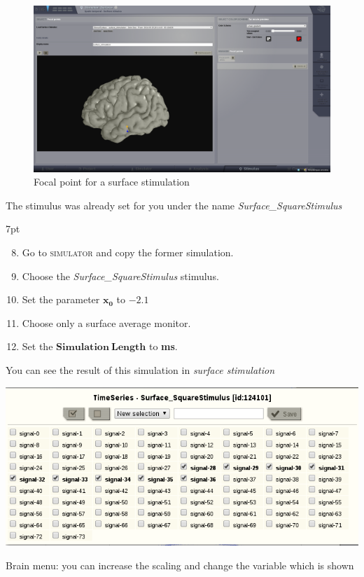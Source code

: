 \documentclass{tufte-handout}
\newenvironment{simulation}{%
  \def\FrameCommand{%
    \hspace{1pt}%
    {\color{ForestGreen}\vrule width 2pt}%
    {\color{simulationshade}\vrule width 4pt}%
    \colorbox{simulationshade}%
  }%
  \MakeFramed{\advance\hsize-\width\FrameRestore}%
  \noindent\hspace{-4.55pt}%
  \begin{adjustwidth}{}{7pt}%
  \vspace{2pt}\vspace{2pt}%
}
{%
  \vspace{2pt}\end{adjustwidth}\endMakeFramed%
}
\begin{document}
\begin{figure}[h]
  \includegraphics[width=\linewidth]{Handout_UI_ModellingAnEpilepticPatient_StimulationFocalPoint}%
  \caption{Focal point for a surface stimulation}%
  \label{fig:stim_foc}%
\end{figure}

The stimulus was already set for you under the name \textit{Surface\_SquareStimulus}

  \begin{simulation}
  \begin{enumerate}
  \setcounter{enumi}{7}
  \item Go to \textsc{simulator} and copy the former simulation.
  \item Choose the \textit{Surface\_SquareStimulus} stimulus.
  \item Set the parameter $\mathbf{x_0}$ to $\mathbf{-2.1}$
  \item Choose only a surface average monitor.
  \item Set the $\mathbf{Simulation\:Length}$ to \textbf{\unit[4000]{ms}}.
 
\end{enumerate}
\end{simulation}


You can see the result of this simulation in \textit{surface stimulation}

\begin{marginfigure}
  \includegraphics[width=\linewidth]{Handout_UI_ModellingAnEpilepticPatient_ChooseChannelsStimulation}%
  \caption{Brain menu: you can increase the scaling and change the variable which is shown}%
  \label{fig:choose_channels}%
\end{marginfigure}
\end{document}
